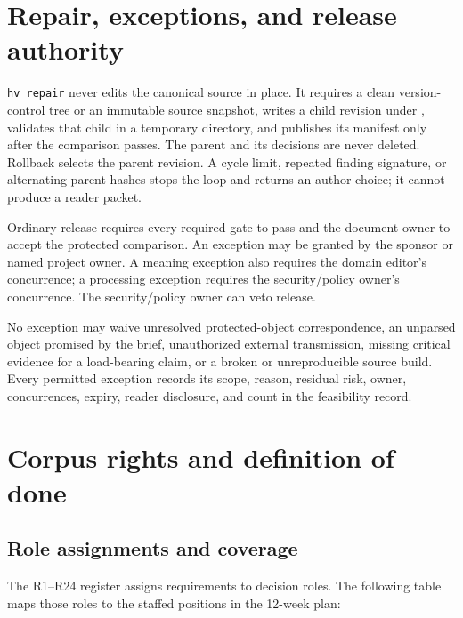 \section{Repair, exceptions, and release authority}
\label{sec:contract-authority}

\texttt{hv repair} never edits the canonical source in place. It requires a
clean version-control tree or an immutable source snapshot, writes a child
revision under ,
validates that child in a temporary directory, and publishes its manifest only
after the comparison passes. The parent and its decisions are never deleted.
Rollback selects the parent revision. A cycle limit, repeated finding
signature, or alternating parent hashes stops the loop and returns an author
choice; it cannot produce a reader packet.

Ordinary release requires every required gate to pass and the document owner to
accept the protected comparison. An exception may be granted by the sponsor or
named project owner. A meaning exception also requires the domain editor's
concurrence; a processing exception requires the security/policy owner's
concurrence. The security/policy owner can veto release.

No exception may waive unresolved protected-object correspondence, an unparsed
object promised by the brief, unauthorized external transmission, missing
critical evidence for a load-bearing claim, or a broken or unreproducible
source build. Every permitted exception records its scope, reason, residual
risk, owner, concurrences, expiry, reader disclosure, and count in the
feasibility record.

\section{Corpus rights and definition of done}
\label{sec:contract-rights-done}

\subsection{Role assignments and coverage}

The R1--R24 register assigns requirements to decision roles. The following
table maps those roles to the staffed positions in the 12-week plan:

